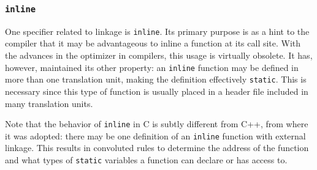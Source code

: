 \subsubsection{\texttt{inline}}

One specifier related to linkage is \texttt{inline}.  Its primary purpose is as
a hint to the compiler that it may be advantageous to inline a function at its
call site.  With the advances in the optimizer in compilers, this usage is
virtually obsolete.  It has, however, maintained its other property: an
\texttt{inline} function may be defined in more than one translation unit,
making the definition effectively \texttt{static}.  This is necessary since this
type of function is usually placed in a header file included in many translation
units.

Note that the behavior of \texttt{inline} in C is subtly different from C++,
from where it was adopted: there may be one definition of an \texttt{inline}
function with external linkage.  This results in convoluted rules to determine
the address of the function and what types of \texttt{static} variables a
function can declare or has access to.
